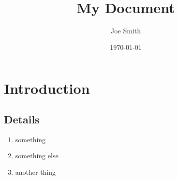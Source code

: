 \documentclass[12pt,letterpaper]{article}
\title{My Document}
\author{Joe Smith}
\date{\today}
\begin{document}
\maketitle

\section{Introduction}

\lipsum[1-4]

\subsection{Details}

\lipsum[1-2]

\begin{enumerate}
\item something
\item something else
\item another thing
\end{enumerate}

\lipsum[1-5]
\end{document}
